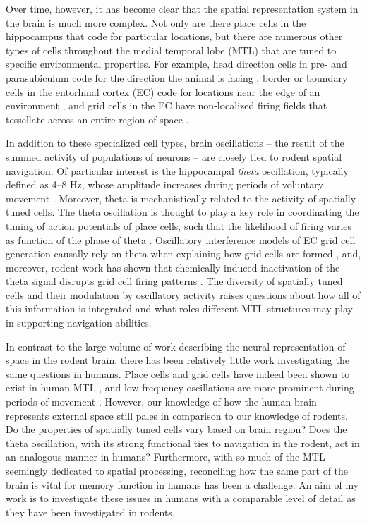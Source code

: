 Over time, however, it has become clear that the spatial representation system in the brain is much more complex. Not only are there place cells in the hippocampus that code for particular locations, but there are numerous other types of cells throughout the medial temporal lobe (MTL) that are tuned to specific environmental properties. For example, head direction cells in pre- and parasubiculum code for the direction the animal is facing \citep{TaubEtal90}, border or boundary cells in the entorhinal cortex (EC) code for locations near the edge of an environment \citep{SolsEtal08}, and grid cells in the EC have non-localized firing fields that tessellate across an entire region of space \citep{HaftEtal05}.

In addition to these specialized cell types, brain oscillations -- the result of the summed activity of populations of neurons \citep{LachEtal03} -- are closely tied to rodent spatial navigation. Of particular interest is the hippocampal \textit{theta} oscillation, typically defined as 4--8 Hz, whose amplitude increases during periods of voluntary movement \citep{Vand69}. Moreover, theta is mechanistically related to the activity of spatially tuned cells. The theta oscillation is thought to play a key role in coordinating the timing of action potentials of place cells, such that the likelihood of firing varies as function of the phase of theta \citep{OKeeRecc93,SkagEtal96}. Oscillatory interference models of EC grid cell generation causally rely on theta when explaining how grid cells are formed \citep{BurgEtal07}, and, moreover, rodent work has shown that chemically induced inactivation of the theta signal disrupts grid cell firing patterns \citep{KoenEtal11,BranEtal11}. The diversity of spatially tuned cells and their modulation by oscillatory activity raises questions about how all of this information is integrated and what roles different MTL structures may play in supporting navigation abilities.

In contrast to the large volume of work describing the neural representation of space in the rodent brain, there has been relatively little work investigating the same questions in humans. Place cells and grid cells have indeed been shown to exist in human MTL \citep{EkstEtal03,JacoEtal10,JacoEtal13}, and low frequency oscillations are more prominent during periods of movement \citep{CaplEtal03,KahaEtal99}. However, our knowledge of how the human brain represents external space still pales in comparison to our knowledge of rodents. Do the properties of spatially tuned cells vary based on brain region? Does the theta oscillation, with its strong functional ties to navigation in the rodent, act in an analogous manner in humans? Furthermore, with so much of the MTL seemingly dedicated to spatial processing, reconciling how the same part of the brain is vital for memory function in humans has been a challenge. An aim of my work is to investigate these issues in humans with a comparable level of detail as they have been investigated in rodents.


